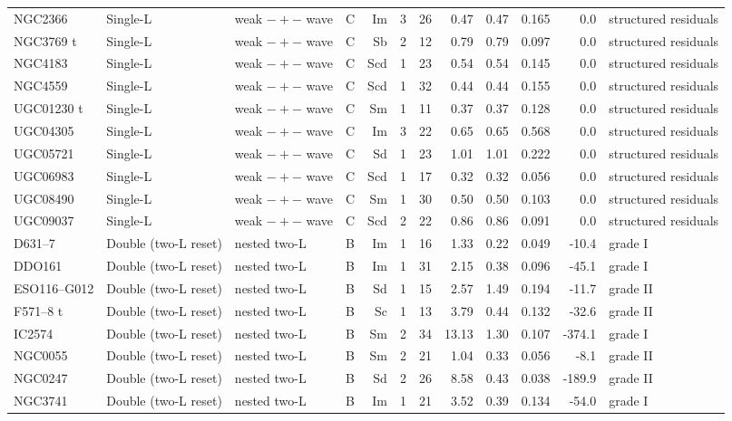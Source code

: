\documentclass[10pt]{article}
\begin{document}
\begin{landscape}
{\begin{longtable}{llllrrrrrrrl}
NGC2366 & Single-L & weak $-+-$ wave & C & Im & 3 & 26 & 0.47 & 0.47 & 0.165 & 0.0 & structured residuals\\
NGC3769 t & Single-L & weak $-+-$ wave & C & Sb & 2 & 12 & 0.79 & 0.79 & 0.097 & 0.0 & structured residuals\\
NGC4183 & Single-L & weak $-+-$ wave & C & Scd & 1 & 23 & 0.54 & 0.54 & 0.145 & 0.0 & structured residuals\\
NGC4559 & Single-L & weak $-+-$ wave & C & Scd & 1 & 32 & 0.44 & 0.44 & 0.155 & 0.0 & structured residuals\\
UGC01230 t & Single-L & weak $-+-$ wave & C & Sm & 1 & 11 & 0.37 & 0.37 & 0.128 & 0.0 & structured residuals\\
UGC04305 & Single-L & weak $-+-$ wave & C & Im & 3 & 22 & 0.65 & 0.65 & 0.568 & 0.0 & structured residuals\\
UGC05721 & Single-L & weak $-+-$ wave & C & Sd & 1 & 23 & 1.01 & 1.01 & 0.222 & 0.0 & structured residuals\\
UGC06983 & Single-L & weak $-+-$ wave & C & Scd & 1 & 17 & 0.32 & 0.32 & 0.056 & 0.0 & structured residuals\\
UGC08490 & Single-L & weak $-+-$ wave & C & Sm & 1 & 30 & 0.50 & 0.50 & 0.103 & 0.0 & structured residuals\\
UGC09037 & Single-L & weak $-+-$ wave & C & Scd & 2 & 22 & 0.86 & 0.86 & 0.091 & 0.0 & structured residuals\\
\midrule
D631--7 & Double (two-L reset) & nested two-L & B & Im & 1 & 16 & 1.33 & 0.22 & 0.049 & -10.4 & grade I\\
DDO161 & Double (two-L reset) & nested two-L & B & Im & 1 & 31 & 2.15 & 0.38 & 0.096 & -45.1 & grade I\\
ESO116--G012 & Double (two-L reset) & nested two-L & B & Sd & 1 & 15 & 2.57 & 1.49 & 0.194 & -11.7 & grade II\\
F571--8 t & Double (two-L reset) & nested two-L & B & Sc & 1 & 13 & 3.79 & 0.44 & 0.132 & -32.6 & grade II\\
IC2574 & Double (two-L reset) & nested two-L & B & Sm & 2 & 34 & 13.13 & 1.30 & 0.107 & -374.1 & grade I\\
NGC0055 & Double (two-L reset) & nested two-L & B & Sm & 2 & 21 & 1.04 & 0.33 & 0.056 & -8.1 & grade II\\
NGC0247 & Double (two-L reset) & nested two-L & B & Sd & 2 & 26 & 8.58 & 0.43 & 0.038 & -189.9 & grade II\\
NGC3741 & Double (two-L reset) & nested two-L & B & Im & 1 & 21 & 3.52 & 0.39 & 0.134 & -54.0 & grade I\\

\end{longtable}}
\end{landscape}
\end{document}
